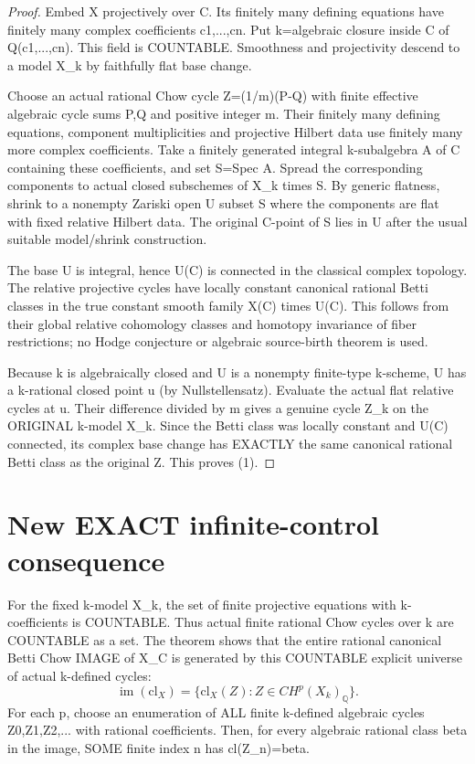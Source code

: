 \documentclass[11pt]{article}
\begin{document}
\begin{proof}
Embed X projectively over C. Its finitely many
defining equations have finitely many complex
coefficients c1,...,cn. Put
k=algebraic closure inside C of Q(c1,...,cn).
This field is COUNTABLE. Smoothness and
projectivity descend to a model X_k by
faithfully flat base change.

Choose an actual rational Chow cycle
Z=(1/m)(P-Q) with finite effective algebraic
cycle sums P,Q and positive integer m.
Their finitely many defining equations,
component multiplicities and projective
Hilbert data use finitely many more complex
coefficients. Take a finitely generated
integral k-subalgebra A of C containing
these coefficients, and set S=Spec A.
Spread the corresponding components to
actual closed subschemes of X_k times S.
By generic flatness, shrink to a nonempty
Zariski open U subset S where the components
are flat with fixed relative Hilbert data.
The original C-point of S lies in U after
the usual suitable model/shrink construction.

The base U is integral, hence U(C) is
connected in the classical complex topology.
The relative projective cycles have
locally constant canonical rational Betti
classes in the true constant smooth
family X(C) times U(C). This follows
from their global relative cohomology
classes and homotopy invariance of
fiber restrictions; no Hodge conjecture
or algebraic source-birth theorem is used.

Because k is algebraically closed and U
is a nonempty finite-type k-scheme, U has
a k-rational closed point u
(by Nullstellensatz). Evaluate the
actual flat relative cycles at u.
Their difference divided by m gives
a genuine cycle Z_k on the ORIGINAL
k-model X_k. Since the Betti class
was locally constant and U(C) connected,
its complex base change has EXACTLY
the same canonical rational Betti class
as the original Z. This proves (1).
\end{proof}

\section{New EXACT infinite-control consequence}
For the fixed k-model X_k, the set of
finite projective equations with k-coefficients
is COUNTABLE. Thus actual finite rational
Chow cycles over k are COUNTABLE as a set.
The theorem shows that the entire rational
canonical Betti Chow IMAGE of X_C is
generated by this COUNTABLE explicit
universe of actual k-defined cycles:
\[
\boxed{
\operatorname{im}(\mathrm{cl}_X)
=
\bigl\{
 \mathrm{cl}_X(Z):
 Z\in CH^p(X_k)_{\mathbb Q}
 \bigr\}.
}\tag{2}
\]
For each p, choose an enumeration of ALL
finite k-defined algebraic cycles
Z0,Z1,Z2,... with rational coefficients.
Then, for every algebraic rational class
beta in the image, SOME finite index n
has cl(Z_n)=beta.
\end{document}

